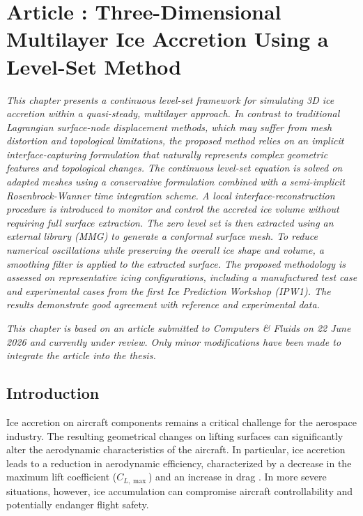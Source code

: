 \chapter{Article : Three-Dimensional Multilayer Ice Accretion Using a Level-Set Method}\label{sec:lsArticle}

\textit
{
This chapter presents a continuous level-set framework for simulating 3D ice accretion within a quasi-steady, multilayer approach. In contrast to traditional Lagrangian surface-node displacement methods, which may suffer from mesh distortion and topological limitations, the proposed method relies on an implicit interface-capturing formulation that naturally represents complex geometric features and topological changes. The continuous level-set equation is solved on adapted meshes using a conservative formulation combined with a semi-implicit Rosenbrock-Wanner time integration scheme. A local interface-reconstruction procedure is introduced to monitor and control the accreted ice volume without requiring full surface extraction. The zero level set is then extracted using an external library (\textup{\textsc{MMG}}) to generate a conformal surface mesh. To reduce numerical oscillations while preserving the overall ice shape and volume, a smoothing filter is applied to the extracted surface. The proposed methodology is assessed on representative icing configurations, including a manufactured test case and experimental cases from the first Ice Prediction Workshop (IPW1). The results demonstrate good agreement with reference and experimental data.
}

\par\vspace{0.5cm}

\noindent\textit{This chapter is based on an article submitted to Computers \& Fluids on 22 June 2026 and currently under review. Only minor modifications have been made to integrate the article into the thesis.}

\section{Introduction}
\label{sec:introduction}
Ice accretion on aircraft components remains a critical challenge for the aerospace industry. The resulting geometrical changes on lifting surfaces can significantly alter the aerodynamic characteristics of the aircraft. In particular, ice accretion leads to a reduction in aerodynamic efficiency, characterized by a decrease in the maximum lift coefficient ($C_{L,\max}$) and an increase in drag \cite{CAO2018353}. In more severe situations, however, ice accumulation can compromise aircraft controllability and potentially endanger flight safety.

